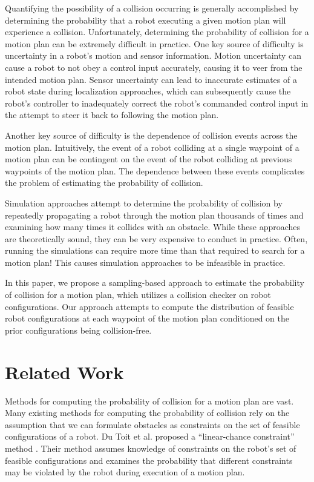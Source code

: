 \documentclass[journal]{IEEEtran}
\begin{document}
Quantifying the possibility of a collision occurring is generally accomplished by determining the probability that a robot executing a given motion plan will experience a collision. Unfortunately, determining the probability of collision for a motion plan can be extremely difficult in practice. One key source of difficulty is uncertainty in a robot's motion and sensor information. Motion uncertainty can cause a robot to not obey a control input accurately, causing it to veer from the intended motion plan. Sensor uncertainty can lead to inaccurate estimates of a robot state during localization approaches, which can subsequently cause the robot's controller to inadequately correct the robot's commanded control input in the attempt to steer it back to following the motion plan.

Another key source of difficulty is the dependence of collision events across the motion plan. Intuitively, the event of a robot colliding at a single waypoint of a motion plan can be contingent on the event of the robot colliding at previous waypoints of the motion plan. The dependence between these events complicates the problem of estimating the probability of collision.

Simulation approaches attempt to determine the probability of collision by repeatedly propagating a robot through the motion plan thousands of times and examining how many times it collides with an obstacle. While these approaches are theoretically sound, they can be very expensive to conduct in practice. Often, running the simulations can require more time than that required to search for a motion plan! This causes simulation approaches to be infeasible in practice.

In this paper, we propose a sampling-based approach to estimate the probability of collision for a motion plan, which utilizes a collision checker on robot configurations. Our approach attempts to compute the distribution of feasible robot configurations at each waypoint of the motion plan conditioned on the prior configurations being collision-free.

\section{Related Work}
Methods for computing the probability of collision for a motion plan are vast. Many existing methods for computing the probability of collision rely on the assumption that we can formulate obstacles as constraints on the set of feasible configurations of a robot. Du Toit et al. proposed a ``linear-chance constraint'' method  \cite{IEEEhowto:dutoit}. Their method assumes knowledge of constraints on the robot's set of feasible configurations and examines the probability that different constraints may be violated by the robot during execution of a motion plan.
\end{document}
